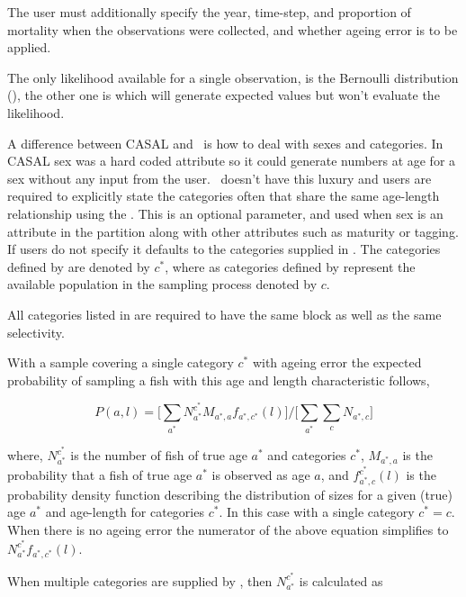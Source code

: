 The user must additionally specify the year, time-step, and proportion of mortality when the observations were collected, and whether ageing error is to be applied. 

The only likelihood available for a single observation, is the Bernoulli distribution (), the other one is  which will generate expected values but won't evaluate the likelihood.


A difference between CASAL and \CNAME\ is how to deal with sexes and categories. In CASAL sex was a hard coded attribute so it could generate numbers at age for a sex without any input from the user. \CNAME\ doesn't have this luxury and users are required to explicitly state the categories often that share the same age-length relationship using the . This is an optional parameter, and used when sex is an attribute in the partition along with other attributes such as maturity or tagging. If users do not specify  it defaults to the categories supplied in . The categories defined by  are denoted by \(c^*\), where as categories defined by  represent the available population in the sampling process denoted by \(c\).

All categories listed in  are required to have the same  block as well as the same selectivity.


With a  sample covering a single category \(c^*\) with ageing error the expected probability of sampling a fish with this age and length characteristic follows,

\[
P(a,l) = \bigg[\sum_{a^*} N^{c^*}_{a^*}M_{a^*,a}f_{a^*,c^*}(l)\bigg] / \bigg[\sum_{a^*}\sum_{c} N_{a^*,c}\bigg]
\]

where, \(N^{c^*}_{a^*}\) is the number of fish of true age \(a^*\) and categories \(c^*\), \(M_{a^*,a}\) is the probability that a fish of true age \(a^*\) is observed as age \(a\), and \(f^{c^*}_{a^*,c}(l)\) is the probability density function describing the distribution of sizes for a given (true) age \(a^*\) and age-length for categories \(c^*\). In this case with a single category \(c^* = c\). When there is no ageing error the numerator of the above equation simplifies to \(N^{c^*}_{a^*}f_{a^*,c^*}(l)\).

When multiple categories are supplied by , then \(N^{c^*}_{a^*}\) is calculated as

